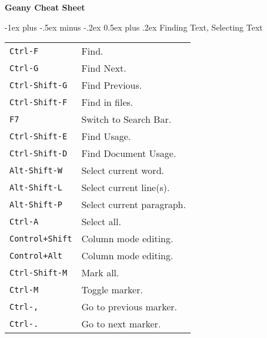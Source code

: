 \documentclass[12pt,landscape]{article}
\makeatletter
\renewcommand{\section}{\@startsection{section}{1}{0mm}%
                                {-1ex plus -.5ex minus -.2ex}%
                                {0.5ex plus .2ex}%
                                {\normalfont\large\bfseries}}
\makeatother
\begin{document}
\raggedright
\footnotesize

\begin{center}
	\Huge{\textbf{Geany Cheat Sheet}} \\
\end{center}
\vspace*{0.5cm}

\begin{multicols}{3}


\setlength{\premulticols}{1pt}
\setlength{\postmulticols}{1pt}
\setlength{\multicolsep}{1pt}
\setlength{\columnsep}{2pt}


\section{Finding Text, Selecting Text}
\begin{tabular}{@{}ll@{}}
	\verb!Ctrl-F! & Find. \\
	\verb!Ctrl-G! & Find Next. \\
	\verb!Ctrl-Shift-G! & Find Previous. \\
	\verb!Ctrl-Shift-F! & Find in files. \\
	\verb!F7! & Switch to Search Bar. \\
	\verb!Ctrl-Shift-E! & Find Usage. \\
	\verb!Ctrl-Shift-D! & Find Document Usage. \\
	\verb!Alt-Shift-W! & Select current word. \\
	\verb!Alt-Shift-L! & Select current line(s). \\
	\verb!Alt-Shift-P! & Select current paragraph. \\
	\verb!Ctrl-A! & Select all. \\
	\verb!Control+Shift! & Column mode editing. \\
	\verb!Control+Alt! & Column mode editing. \\
	\verb!Ctrl-Shift-M! & Mark all. \\
	\verb!Ctrl-M! & Toggle marker. \\
	\verb!Ctrl-,! & Go to previous marker. \\
	\verb!Ctrl-.! & Go to next marker. \\
\end{tabular}


\end{multicols}
\end{document}
